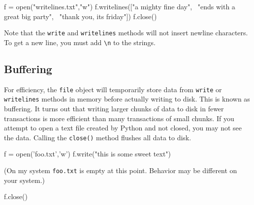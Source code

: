 \documentclass[12pt]{article} \newif\ifsolution\solutiontrue %
\begin{document}
\begin{python}
f = open("writelines.txt","w")
f.writelines(["a mighty fine day\n", \
              "ends with a great big party\n", \
              "thank you, its friday\n"])
f.close()
\end{python}

Note that the \texttt{write} and \texttt{writelines} methods will not
insert newline characters. To get a new line, you must add
\texttt{\textquotesingle{}\textbackslash{}n\textquotesingle{}} to the
strings.

\subsection{Buffering}\label{buffering}

For efficiency, the \texttt{file} object will temporarily store data
from \texttt{write} or \texttt{writelines} methods in memory before
actually writing to disk. This is known as buffering. It turns out that
writing larger chunks of data to disk in fewer transactions is more
efficient than many transactions of small chunks. If you attempt to open
a text file created by Python and not closed, you may not see the data.
Calling the \texttt{close()} method flushes all data to disk.

\begin{python}
f = open('foo.txt','w')
f.write("this is some sweet text\n")
\end{python}

(On my system \texttt{foo.txt} is empty at this point. Behavior may be
different on your system.)

\begin{python}
f.close()
\end{python}
\end{document}
